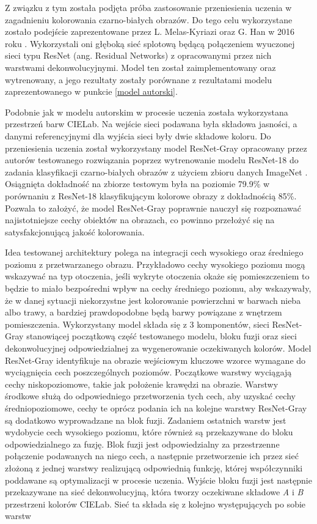   Z związku z tym została podjęta próba zastosowanie przeniesienia uczenia w
  zagadnieniu kolorowania czarno-białych obrazów. Do tego celu wykorzystane
  zostało podejście zaprezentowane przez L. Melas-Kyriazi oraz G. Han w 2016
  roku \cite{deconvolution_colorization}. Wykorzystali oni głęboką sieć
  splotową będącą połączeniem wyuczonej sieci typu ResNet
  (ang. Residual Networks) \cite{ResNet}
  z opracowanymi przez nich warstwami dekonwolucyjnymi. Model ten został
  zaimplementowany oraz wytrenowany, a jego rezultaty zostały porównane z
  rezultatami modelu zaprezentowanego w punkcie \ref{model autorski}.

  Podobnie jak w modelu autorskim w procesie uczenia została wykorzystana przestrzeń
  barw CIELab. Na wejście sieci podawana była składowa jasności, a danymi
  referencyjnymi dla wyjścia sieci były dwie składowe koloru. Do przeniesienia
  uczenia został wykorzystany model
  ResNet-Gray opracowany przez autorów testowanego rozwiązania poprzez
  wytrenowanie modelu ResNet-18 do zadania klasyfikacji czarno-białych obrazów
  z użyciem zbioru danych ImageNet \cite{ImageNet}. Osiągnięta dokładność na zbiorze testowym
  była na poziomie 79.9\% w porównaniu z ResNet-18 klasyfikującym kolorowe obrazy z
  dokładnością 85\%. Pozwala to założyć, że model ResNet-Gray poprawnie nauczył
  się rozpoznawać najistotniejsze cechy obiektów na obrazach, co powinno
  przełożyć się na satysfakcjonującą jakość kolorowania.

  Idea testowanej architektury
  polega na integracji cech wysokiego oraz średniego poziomu z przetwarzanego obrazu.
  Przykładowo cechy wysokiego poziomu mogą wskazywać na typ otoczenia, jeśli
  wykryte otoczenia okaże się pomieszczeniem to będzie to miało bezpośredni wpływ
  na cechy średniego poziomu, aby wskazywały, że w danej
  sytuacji niekorzystne jest kolorowanie powierzchni w barwach nieba albo trawy,
  a bardziej prawdopodobne będą barwy powiązane z wnętrzem pomieszczenia.
  Wykorzystany model składa się z 3 komponentów, sieci ResNet-Gray stanowiącej
  początkową część testowanego modelu, bloku fuzji oraz sieci dekonwolucyjnej
  odpowiedzialnej za wygenerowanie oczekiwanych kolorów.
  Model ResNet-Gray identyfikuje
  na obrazie wejściowym kluczowe wzorce wymagane do wyciągnięcia cech
  poszczególnych poziomów. Początkowe warstwy wyciągają cechy niskopoziomowe, takie jak położenie krawędzi na obrazie. Warstwy środkowe
  służą do odpowiedniego przetworzenia tych cech, aby uzyskać cechy średniopoziomowe,
  cechy te oprócz podania ich na kolejne warstwy ResNet-Gray są dodatkowo wyprowadzane
  na blok fuzji. Zadaniem ostatnich warstw jest wydobycie cech
  wysokiego poziomu, które również są przekazywane do bloku odpowiedzialnego za
  fuzję. Blok fuzji jest odpowiedzialny za przestrzenne połączenie podawanych
  na niego cech, a następnie przetworzenie ich przez sieć złożoną z jednej
  warstwy realizującą odpowiednią funkcję, której współczynniki poddawane są
  optymalizacji w procesie uczenia.
  Wyjście bloku fuzji jest następnie przekazywane na sieć dekonwolucyjną, która
  tworzy oczekiwane składowe \textit{A} i \textit{B} przestrzeni kolorów CIELab.
  Sieć ta składa się z kolejno występujących po sobie warstw 
